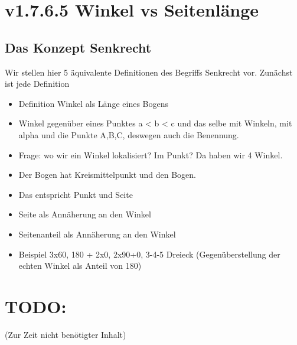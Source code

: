 \documentclass[a4paper]{amsart}
\theoremstyle{definition}
\begin{document}
\section{v1.7.6.5 Winkel vs Seitenlänge}

\subsection{Das Konzept Senkrecht}
Wir stellen hier 5 äquivalente Definitionen des Begriffs Senkrecht vor. Zunächst ist jede Definition 


\begin{itemize}
   \item Definition Winkel als Länge eines Bogens
   \item Winkel gegenüber eines Punktes a < b < c und das selbe mit Winkeln, mit alpha und die Punkte A,B,C, deswegen auch die Benennung.
   \item Frage: wo wir ein Winkel lokalisiert? Im Punkt? Da haben wir 4 Winkel.
   \item Der Bogen hat Kreismittelpunkt und den Bogen.
   \item Das entspricht Punkt und Seite
   \item Seite als Annäherung an den Winkel
   \item Seitenanteil als Annäherung an den Winkel
   \item Beispiel 3x60, 180 + 2x0, 2x90+0, 3-4-5 Dreieck (Gegenüberstellung der echten Winkel als Anteil von 180)
\end{itemize}

\section{TODO:}
\begin{backup}
    (Zur Zeit nicht benötigter Inhalt)
\end{backup}
\end{document}
